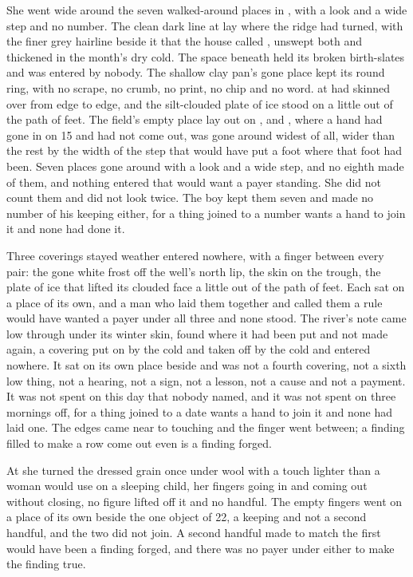 She went wide around the seven walked-around places in , with a look and a wide step and no number. The clean dark line at  lay where the ridge had turned, with the finer grey hairline beside it that the house called , unswept both and thickened in the month's dry cold. The space beneath  held its broken birth-slates and was entered by nobody. The shallow clay pan's gone place kept its round ring, with no scrape, no crumb, no print, no chip and no word.  at  had skinned over from edge to edge, and the silt-clouded plate of ice stood on  a little out of the path of feet. The field's empty place lay out on , and , where a hand had gone in on  15 and had not come out, was gone around widest of all, wider than the rest by the width of the step that would have put a foot where that foot had been. Seven places gone around with a look and a wide step, and no eighth made of them, and nothing entered that would want a payer standing. She did not count them and did not look twice. The boy kept them seven and made no number of his keeping either, for a thing joined to a number wants a hand to join it and none had done it.

Three coverings stayed weather entered nowhere, with a finger between every pair: the gone white frost off the well's north lip, the skin on the trough, the plate of ice that lifted its clouded face a little out of the path of feet. Each sat on a place of its own, and a man who laid them together and called them a rule would have wanted a payer under all three and none stood. The river's note came low through  under its winter skin, found where it had been put and not made again, a covering put on by the cold and taken off by the cold and entered nowhere. It sat on its own place beside  and was not a fourth covering, not a sixth low thing, not a hearing, not a sign, not a lesson, not a cause and not a payment. It was not spent on this day that nobody named, and it was not spent on  three mornings off, for a thing joined to a date wants a hand to join it and none had laid one. The edges came near to touching and the finger went between; a finding filled to make a row come out even is a finding forged.

At  she turned the dressed grain once under wool with a touch lighter than a woman would use on a sleeping child, her fingers going in and coming out without closing, no figure lifted off it and no handful. The empty fingers went on a place of its own beside the one object of  22, a keeping and not a second handful, and the two did not join. A second handful made to match the first would have been a finding forged, and there was no payer under either to make the finding true.

